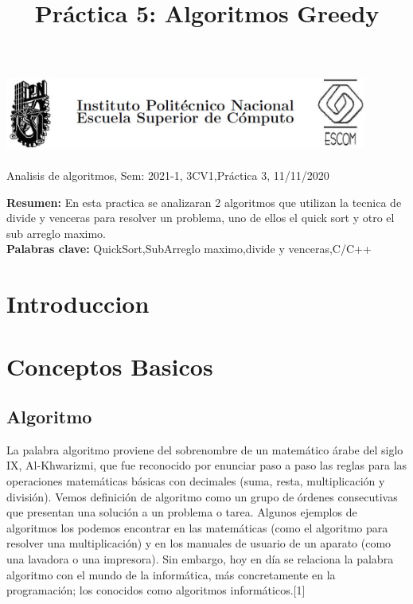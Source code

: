 \documentclass[spanish]{article}
\title {Práctica 5: Algoritmos Greedy}
\begin{document}
	\centerline{\includegraphics[width=450px,height=100px]{header}}
	\centerline{Analisis de algoritmos, Sem: 2021-1, 3CV1,Práctica  3, 11/11/2020}
	\centerline{}
	\bigskip
	\justify
	\textbf{Resumen:}	
	En esta practica se analizaran 2 algoritmos que utilizan la tecnica de divide y venceras para resolver un problema, uno de ellos el quick sort y otro el sub arreglo maximo.\\
	\textbf{Palabras clave:}
	QuickSort,SubArreglo maximo,divide y venceras,C/C++
	\section{Introduccion}
	
	\section{Conceptos Basicos}
	\subsection{Algoritmo}
		La palabra algoritmo proviene del sobrenombre de un matemático árabe del siglo IX, Al-Khwarizmi, que fue reconocido por enunciar paso a paso las reglas para las operaciones matemáticas básicas con decimales (suma, resta, multiplicación y división).	
		Vemos definición de algoritmo como un grupo de órdenes consecutivas que presentan una solución a un problema o tarea. Algunos ejemplos de algoritmos los podemos encontrar en las matemáticas (como el algoritmo para resolver una multiplicación) y en los manuales de usuario de un aparato (como una lavadora o una impresora).	
		Sin embargo, hoy en día se relaciona la palabra algoritmo con el mundo de la informática, más concretamente en la programación; los conocidos como algoritmos informáticos.[1]
\end{document}
